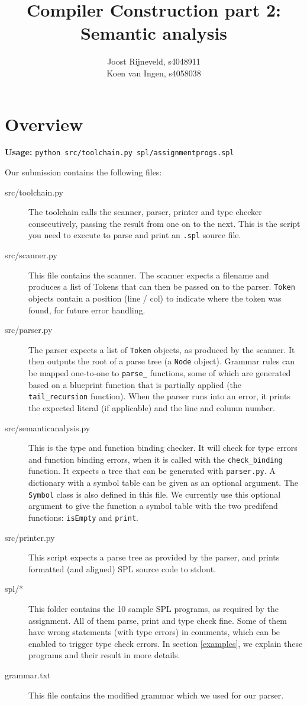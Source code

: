 \documentclass[a4paper]{article}
\title{Compiler Construction part 2: Semantic analysis}
\author{Joost Rijneveld, s4048911\\Koen van Ingen, s4058038}
\date{}
\begin{document}
\maketitle

\section{Overview}
{\bf Usage:} {\tt python src/toolchain.py spl/assignmentprogs.spl}

Our submission contains the following files:

\begin{description}
	\item[src/toolchain.py] The toolchain calls the scanner, parser, printer and type checker consecutively, passing the result from one on to the next. This is the script you need to execute to parse and print an {\tt .spl} source file.
	\item[src/scanner.py] This file contains the scanner. The scanner expects a filename and produces a list of Tokens that can then be passed on to the parser. {\tt Token} objects contain a position (line / col) to indicate where the token was found, for future error handling.
	\item[src/parser.py] The parser expects a list of {\tt Token} objects, as produced by the scanner. It then outputs the root of a parse tree (a {\tt Node} object). Grammar rules can be mapped one-to-one to {\tt parse\_} functions, some of which are generated based on a blueprint function that is partially applied (the {\tt tail\_recursion} function). When the parser runs into an error, it prints the expected literal (if applicable) and the line and column number.
	\item[src/semanticanalysis.py] This is the type and function binding checker. It will check for type errors and function binding errors, when it is called with the {\tt check\_binding} function. It expects a tree that can be generated with {\tt parser.py}. A dictionary with a symbol table can be given as an optional argument. The {\tt Symbol} class is also defined in this file. We currently use this optional argument to give the function a symbol table with the two predifend functions: {\tt isEmpty} and {\tt print}. 
	\item[src/printer.py] This script expects a parse tree as provided by the parser, and prints formatted (and aligned) SPL source code to stdout.
	\item[spl/*] This folder contains the 10 sample SPL programs, as required by the assignment. All of them parse, print and type check fine. Some of them have wrong statements (with type errors) in comments, which can be enabled to trigger type check errors. In section \ref{examples}, we explain these programs and their result in more details.
	\item[grammar.txt] This file contains the modified grammar which we used for our parser.
\end{description}
\end{document}
